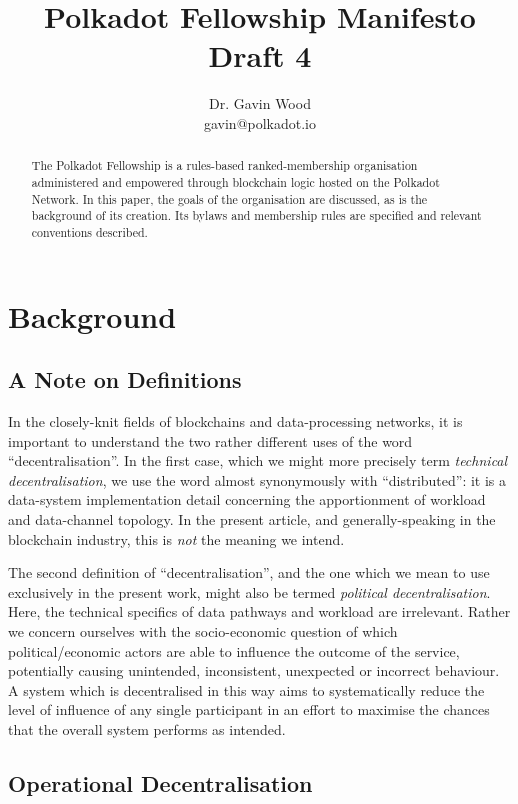 \documentclass[9pt,oneside]{amsart}
\title{Polkadot Fellowship Manifesto \\ {\smaller \textbf{Draft 4}}}
\author{ Dr. Gavin Wood\\ gavin@polkadot.io}
\begin{document}
\begin{abstract}

The Polkadot Fellowship is a rules-based ranked-membership organisation administered and empowered through blockchain logic hosted on the Polkadot Network. In this paper, the goals of the organisation are discussed, as is the background of its creation. Its bylaws and membership rules are specified and relevant conventions described.

\end{abstract}

\maketitle

\section{Background}\label{background}

\subsection{A Note on Definitions}

In the closely-knit fields of blockchains and data-processing networks, it is important to understand the two rather different uses of the word ``decentralisation''. In the first case, which we might more precisely term \emph{technical decentralisation}, we use the word almost synonymously with ``distributed'': it is a data-system implementation detail concerning the apportionment of workload and data-channel topology. In the present article, and generally-speaking in the blockchain industry, this is \emph{not} the meaning we intend.

The second definition of ``decentralisation'', and the one which we mean to use exclusively in the present work, might also be termed \emph{political decentralisation}. Here, the technical specifics of data pathways and workload are irrelevant. Rather we concern ourselves with the socio-economic question of which political/economic actors are able to influence the outcome of the service, potentially causing unintended, inconsistent, unexpected or incorrect behaviour. A system which is decentralised in this way aims to systematically reduce the level of influence of any single participant in an effort to maximise the chances that the overall system performs as intended.

\subsection{Operational Decentralisation}
\end{document}
